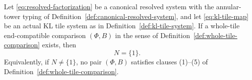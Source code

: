 \begin{theorem}\label{thm:whole-tile-no-go}
Let \eqref{eq:resolved-factorization} be a canonical resolved system with the annular-tower typing of Definition~\ref{def:canonical-resolved-system}, and let \eqref{eq:kl-tile-map} be an actual KL tile system as in Definition~\ref{def:kl-tile-system}.  If a whole-tile end-compatible comparison \((\Phi,B)\) in the sense of Definition~\ref{def:whole-tile-comparison} exists, then
\begin{equation}\label{eq:forced-trivial-kernel}
N=\{1\}.
\end{equation}
Equivalently, if \(N\ne\{1\}\), no pair \((\Phi,B)\) satisfies clauses (1)--(5) of Definition~\ref{def:whole-tile-comparison}.
\end{theorem}

